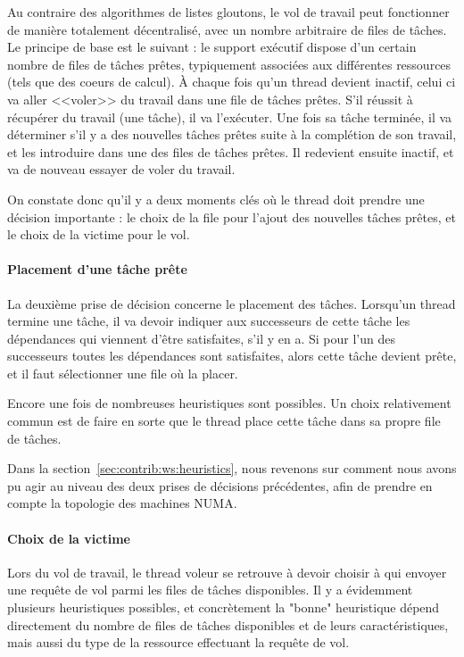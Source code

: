 Au contraire des algorithmes de listes gloutons, le vol de travail peut fonctionner de manière totalement décentralisé, avec un nombre arbitraire de files de tâches.
Le principe de base est le suivant : le support exécutif dispose d'un certain nombre de files de tâches prêtes, typiquement associées aux différentes ressources (tels que des coeurs de calcul).
À chaque fois qu'un thread devient inactif, celui ci va aller <<voler>> du travail dans une file de tâches prêtes.
S'il réussit à récupérer du travail (une tâche), il va l'exécuter.
Une fois sa tâche terminée, il va déterminer s'il y a des nouvelles tâches prêtes suite à la complétion de son travail, et les introduire dans une des files de tâches prêtes.
Il redevient ensuite inactif, et va de nouveau essayer de voler du travail.

On constate donc qu'il y a deux moments clés où le thread doit prendre une décision importante : le choix de la file pour l'ajout des nouvelles tâches prêtes, et le choix de la victime pour le vol.

\paragraph{Placement d'une tâche prête}

La deuxième prise de décision concerne le placement des tâches.
Lorsqu'un thread termine une tâche, il va devoir indiquer aux successeurs de cette tâche les dépendances qui viennent d'être satisfaites, s'il y en a.
Si pour l'un des successeurs toutes les dépendances sont satisfaites, alors cette tâche devient prête, et il faut sélectionner une file où la placer.

Encore une fois de nombreuses heuristiques sont possibles. Un choix relativement commun est de faire en sorte que le thread place cette tâche dans sa propre file de tâches.


Dans la section~\ref{sec:contrib:ws:heuristics}, nous revenons sur comment nous avons pu agir au niveau des deux prises de décisions précédentes, afin de prendre en compte la topologie des machines NUMA.

\paragraph{Choix de la victime}

Lors du vol de travail, le thread voleur se retrouve à devoir choisir à qui envoyer une requête de vol parmi les files de tâches disponibles.
Il y a évidemment plusieurs heuristiques possibles, et concrètement la "bonne" heuristique dépend directement du nombre de files de tâches disponibles et de leurs caractéristiques, mais aussi du type de la ressource effectuant la requête de vol.

